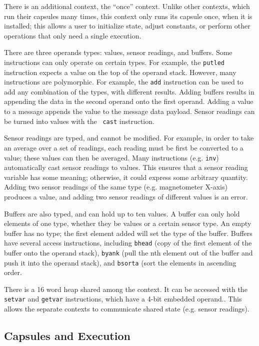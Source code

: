 \documentclass[10pt]{article}
\begin{document}
There is an additional context, the ``once'' context. Unlike other
contexts, which run their capsules many times, this context only runs
its capsule once, when it is installed; this allows a user to
initialize state, adjust constants, or perform other operations that
only need a single execution.

There are three operands types: values, sensor readings, and
buffers. Some instructions can only operate on certain types. For
example, the {\tt putled} instruction expects a value on the top of
the operand stack. However, many instructions are polymorphic. For
example, the {\tt add} instruction can be used to add any combination
of the types, with different results. Adding buffers results in
appending the data in the second operand onto the first
operand. Adding a value to a message appends the value to the message
data payload. Sensor readings can be turned into values with the {\tt
cast} instruction.

Sensor readings are typed, and cannot be modified. For example, in
order to take an average over a set of readings, each reading must be
first be converted to a value; these values can then be averaged. Many
instructions (e.g. {\tt inv}) automatically cast sensor readings to
values. This ensures that a sensor reading variable has some meaning;
otherwise, it could express some arbitrary quantity. Adding two sensor
readings of the same type (e.g. magnetometer X-axis) produces a value,
and adding two sensor readings of different values is an error.

Buffers are also typed, and can hold up to ten values. A buffer can
only hold elements of one type, whether they be values or a certain
sensor type. An empty buffer has no type; the first element added will
set the type of the buffer. Buffers have several access instructions,
including {\tt bhead} (copy of the first element of the buffer onto
the operand stack), {\tt byank} (pull the nth element out of the
buffer and push it into the operand stack), and {\tt bsorta} (sort the
elements in ascending order.

There is a 16 word heap shared among the context. It can be accessed
with the {\tt setvar} and {\tt getvar} instructions, which have a
4-bit embedded operand.. This allows the separate contexts to
communicate shared state (e.g. sensor readings).

\subsection{Capsules and Execution}
\end{document}
